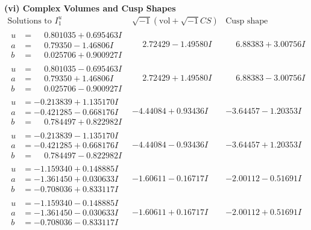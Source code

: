 \documentclass[1p]{elsarticle_modified}
\theoremstyle{definition}
\newcommand{\I}{\sqrt{-1}}
\begin{document}
\newpage\flushleft \textbf{(vi) Complex Volumes and Cusp Shapes}
$$\begin{array}{c|c|c}  
\text{Solutions to }I^u_{1}& \I (\text{vol} + \sqrt{-1}CS) & \text{Cusp shape}\\
 \hline 
\begin{aligned}
u &= \phantom{-}0.801035 + 0.695463 I \\
a &= \phantom{-}0.79350 - 1.46806 I \\
b &= \phantom{-}0.025706 + 0.900927 I\end{aligned}
 & \phantom{-}2.72429 - 1.49580 I & \phantom{-}6.88383 + 3.00756 I \\ \hline\begin{aligned}
u &= \phantom{-}0.801035 - 0.695463 I \\
a &= \phantom{-}0.79350 + 1.46806 I \\
b &= \phantom{-}0.025706 - 0.900927 I\end{aligned}
 & \phantom{-}2.72429 + 1.49580 I & \phantom{-}6.88383 - 3.00756 I \\ \hline\begin{aligned}
u &= -0.213839 + 1.135170 I \\
a &= -0.421285 - 0.668176 I \\
b &= \phantom{-}0.784497 + 0.822982 I\end{aligned}
 & -4.44084 + 0.93436 I & -3.64457 - 1.20353 I \\ \hline\begin{aligned}
u &= -0.213839 - 1.135170 I \\
a &= -0.421285 + 0.668176 I \\
b &= \phantom{-}0.784497 - 0.822982 I\end{aligned}
 & -4.44084 - 0.93436 I & -3.64457 + 1.20353 I \\ \hline\begin{aligned}
u &= -1.159340 + 0.148885 I \\
a &= -1.361450 + 0.030633 I \\
b &= -0.708036 + 0.833117 I\end{aligned}
 & -1.60611 - 0.16717 I & -2.00112 - 0.51691 I \\ \hline\begin{aligned}
u &= -1.159340 - 0.148885 I \\
a &= -1.361450 - 0.030633 I \\
b &= -0.708036 - 0.833117 I\end{aligned}
 & -1.60611 + 0.16717 I & -2.00112 + 0.51691 I \\ \hline\begin{aligned}

\end{aligned}
\end{array}$$
\end{document}
